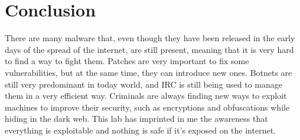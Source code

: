 \section{Conclusion}
\label{s:Week2-Conclusion}
There are many malware that, even though they have been released in the early
days of the spread of the internet, are still present, meaning that it is very
hard to find a way to fight them. Patches are very important to fix some
vulnerabilities, but at the same time, they can introduce new ones. Botnets are
still very predominant in today world, and IRC is still being used to manage
them in a very efficient way. Criminals are always finding new ways to exploit
machines to improve their security, such as encryptions and obfuscations while
hiding in the dark web. This lab has imprinted in me the awareness that
everything is exploitable and nothing is safe if it's exposed on the internet.

